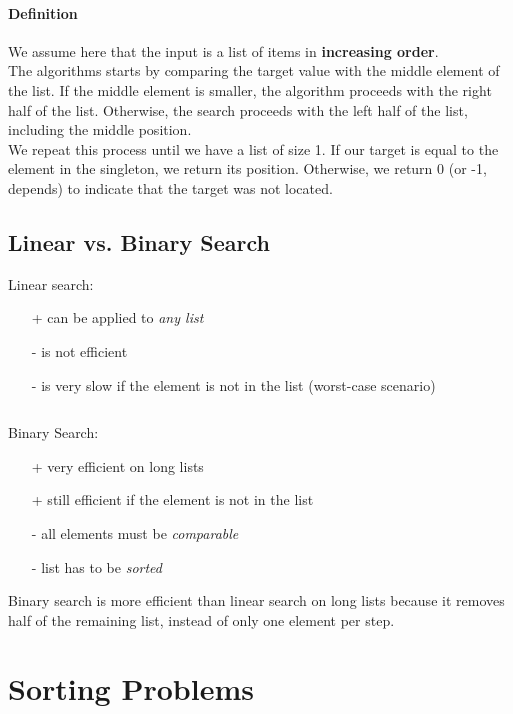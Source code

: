 \documentclass[10pt,a4paper]{book}
\begin{document}
\paragraph*{Definition}
We assume here that the input is a list of items in \textbf{increasing order}.\\
The algorithms starts by comparing the target value with the middle element of the list. If the middle element is smaller, the algorithm proceeds with the right half of the list. Otherwise, the search proceeds with the left half of the list, including the middle position.\\
We repeat this process until we have a list of size 1. If our target is equal to the element in the singleton, we return its position. Otherwise, we return 0 (or -1, depends) to indicate that the target was not located.

\subsection{Linear vs. Binary Search}
\begin{multicols}{2}
Linear search:
\begin{itemize}
\item[+]can be applied to \textit{any list}
\item[-]is not efficient
\item[-]is very slow if the element is not in the list (worst-case scenario)\par
$\ $\par
\end{itemize}
\columnbreak
Binary Search:
\begin{itemize}
\item[+]very efficient on long lists
\item[+]still efficient if the element is not in the list
\item[-]all elements must be \textit{comparable}
\item[-]list has to be \textit{sorted}
\end{itemize}
\end{multicols}
Binary search is more efficient than linear search on long lists because it removes half of the remaining list, instead of only one element per step.

\section{Sorting Problems}
\end{document}
